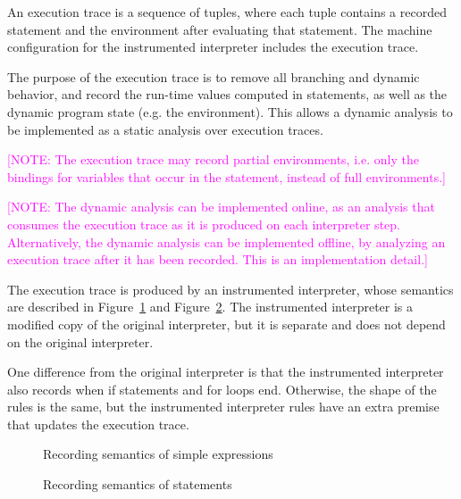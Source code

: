 \documentclass{article}
\newcommand{\irem}[3]{{\noindent\textcolor{#1}{\textsf{[#2: 
#3]}}}}
\newcommand{\note}[1]{\irem{magenta}{NOTE}{#1}}
\begin{document}
An execution trace is a sequence of tuples, where each tuple contains a recorded
statement and the environment after evaluating that statement. The machine
configuration for the instrumented interpreter includes the execution trace.

The purpose of the execution trace is to remove all branching and dynamic
behavior, and record the run-time values computed in statements, as well as the
dynamic program state (e.g. the environment). This allows a dynamic analysis to
be implemented as a static analysis over execution traces.

\note{The execution trace may record partial environments, i.e. only the
bindings for variables that occur in the statement, instead of full
environments.}

\note{The dynamic analysis can be implemented online, as an analysis that
consumes the execution trace as it is produced on each interpreter step.
Alternatively, the dynamic analysis can be implemented offline, by analyzing an
execution trace after it has been recorded. This is an implementation detail.}

The execution trace is produced by an instrumented interpreter, whose semantics
are described in Figure~\ref{fig:rec-semantics-se} and
Figure~\ref{fig:rec-semantics-s}. The instrumented interpreter is
a modified copy of the original interpreter, but it is separate and does not
depend on the original interpreter.

One difference from the original interpreter is that the instrumented
interpreter also records when \textsf{if} statements and \textsf{for} loops end.
Otherwise, the shape of the rules is the same, but the instrumented interpreter
rules have an extra premise that updates the execution trace.

\begin{figure}[th]
  \begin{center}
    \begin{small}
      \ottdefnrecXXse{}%
    \end{small}
  \end{center}
  \caption{Recording semantics of simple expressions}\label{fig:rec-semantics-se}
\end{figure}

\begin{figure}[thp!]
  \begin{center}
    \begin{small}
      \ottdefnrecXXs{}%
    \end{small}
  \end{center}
  \caption{Recording semantics of statements}\label{fig:rec-semantics-s}
\end{figure}
\end{document}
